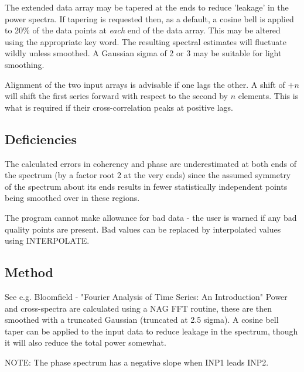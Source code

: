 \documentclass{book}
\renewcommand{\_}{{\tt\char'137}}     %
\begin{document}
The extended data array may be tapered at the ends to reduce
'leakage' in the power spectra. If tapering is requested then,
as a default, a cosine bell is applied to 20\% of the data points
at {\em each} end of the data array. This may be altered using the
appropriate key word. The resulting spectral estimates will
fluctuate wildly unless smoothed. A Gaussian sigma of 2 or 3 may
be suitable for light smoothing.
 
Alignment of the two input arrays is advisable if one lags the
other. A shift of $+n$ will shift the first series forward with
respect to the second by $n$ elements. This is what is required if
their cross-correlation peaks at positive lags.
 
\subsection{Deficiencies}
The calculated errors in coherency and phase are underestimated
at both ends of the spectrum (by a factor root 2 at the very
ends) since the assumed symmetry of the spectrum about its ends
results in fewer statistically independent points being smoothed
over in these regions.
 
The program cannot make allowance for bad data - the user is
warned if any bad quality points are present. Bad values can be
replaced by interpolated values using INTERPOLATE.
 
\subsection{Method}
See e.g. Bloomfield - "Fourier Analysis of Time Series: An
Introduction" Power and cross-spectra are calculated using a NAG
FFT routine, these are then smoothed with a truncated Gaussian
(truncated at 2.5 sigma). A cosine bell taper can be applied to
the input data to reduce leakage in the spectrum, though it will
also reduce the total power somewhat.
 
NOTE: The phase spectrum has a negative slope when INP1
leads INP2.
\end{document}
